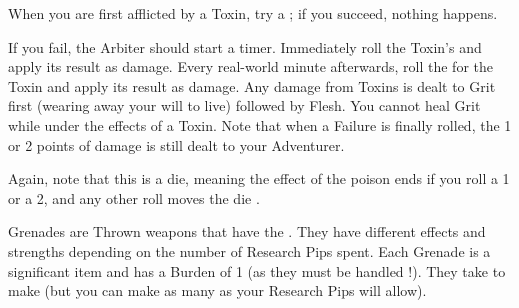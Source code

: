   When you are first afflicted by a Toxin, try a ; if you succeed, nothing happens.

  If you fail, the Arbiter should start a timer. Immediately roll the Toxin's \Duration and apply its result as damage. Every real-world minute afterwards, roll the \Duration for the Toxin and apply its result as damage. Any damage from Toxins is dealt to Grit first (wearing away your will to live) followed by Flesh. You cannot heal Grit while under the effects of a Toxin.  Note that when a Failure is finally rolled, the 1 or 2 points of damage is still dealt to your Adventurer.

 Again, note that this is a  die, meaning the effect of the poison ends if you roll a 1 or a 2, and any other roll moves the die \DCDOWN.





\begin{center}
\end{center}






Grenades are Thrown \INT weapons that have the . They have different effects and strengths depending on the number of Research Pips spent. Each Grenade is a significant item and has a Burden of 1 (as they must be handled !). They take  to make (but you can make as many as your Research Pips will allow).



